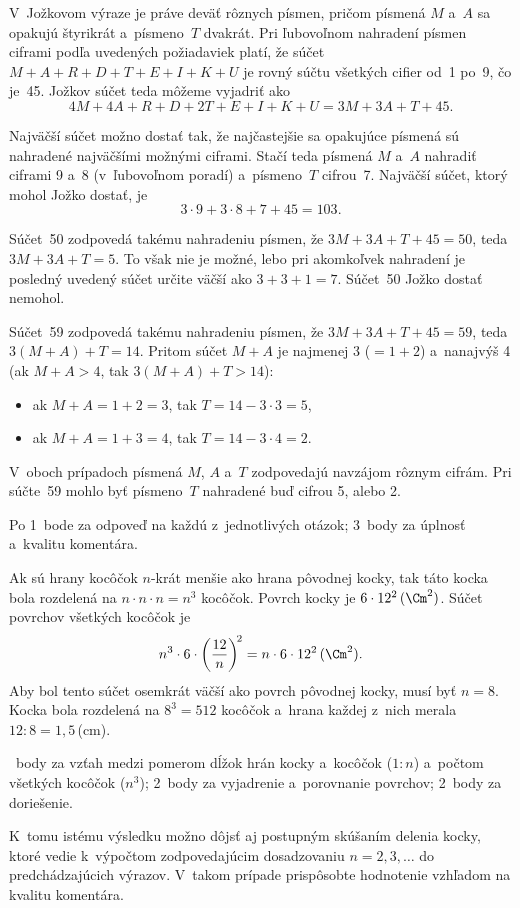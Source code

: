{%
V~Jožkovom výraze je práve deväť rôznych písmen, pričom písmená $M$ a~$A$ sa opakujú štyrikrát a~písmeno~$T$ dvakrát.
Pri ľubovoľnom nahradení písmen ciframi podľa uvedených požiadaviek platí, že súčet $M+A+R+D+T+E+I+K+U$ je rovný súčtu všetkých cifier od~1 po~9, čo je~45.
Jožkov súčet teda môžeme vyjadriť ako
$$
4M+4A+R+D+2T+E+I+K+U=3M+3A+T+45.
$$

Najväčší súčet možno dostať tak, že najčastejšie sa opakujúce písmená sú nahradené najväčšími možnými ciframi.
Stačí teda písmená $M$ a~$A$ nahradiť ciframi 9 a~8 (v~ľubovoľnom poradí) a~písmeno~$T$ cifrou~7.
Najväčší súčet, ktorý mohol Jožko dostať, je
$$
3\cdot9+3\cdot8+7+45=103.
$$

Súčet~50 zodpovedá takému nahradeniu písmen, že $3M+3A+T+45=50$, teda $3M+3A+T=5$.
To však nie je možné, lebo pri akomkoľvek nahradení je posledný uvedený súčet určite väčší ako $3+3+1=7$.
Súčet~50 Jožko dostať nemohol.

Súčet~59 zodpovedá takému nahradeniu písmen, že $3M+3A+T+45=59$, teda $3(M+A)+T=14$.
Pritom súčet $M+A$ je najmenej 3 ($=1+2$) a~nanajvýš 4 (ak $M+A>4$, tak $3(M+A)+T>14$):
\begin{itemize}
\item ak $M+A=1+2=3$, tak $T=14-3\cdot3=5$,
\item ak $M+A=1+3=4$, tak $T=14-3\cdot4=2$.
\end{itemize}
V~oboch prípadoch písmená $M$, $A$ a~$T$ zodpovedajú navzájom rôznym cifrám.
Pri súčte~59 mohlo byť písmeno~$T$ nahradené buď cifrou 5, alebo 2.

\hodnotenie
Po 1~bode za odpoveď na každú z~jednotlivých otázok;
3~body za úplnosť a~kvalitu komentára.
\endhodnotenie
}

{%
Ak sú hrany kocôčok $n$-krát menšie ako hrana pôvodnej kocky, tak
táto kocka bola rozdelená na $n\cdot n\cdot n=n^3$ kocôčok.
Povrch kocky je $6\cdot12^2\,(\Cm^2)$.
Súčet povrchov všetkých kocôčok je
$$
n^3\cdot 6\cdot\left(\frac{12}n\right)^{\!2} =n\cdot 6\cdot12^2\,(\Cm^2).
$$
Aby bol tento súčet osemkrát väčší ako povrch pôvodnej kocky, musí byť $n=8$.
Kocka bola rozdelená na $8^3=512$ kocôčok a~hrana každej z~nich merala $12:8=1{,}5$\,(cm).

~body za vzťah medzi pomerom dĺžok hrán kocky a~kocôčok ($1:n$) a~počtom všetkých kocôčok ($n^3$);
2~body za vyjadrenie a~porovnanie povrchov;
2~body za doriešenie.

\poznamka
K~tomu istému výsledku možno dôjsť aj postupným skúšaním delenia kocky, ktoré vedie k~výpočtom zodpovedajúcim dosadzovaniu $n=2,3,\dots$ do predchádzajúcich výrazov.
V~takom prípade prispôsobte hodnotenie vzhľadom na kvalitu komentára.
\endhodnotenie
}

